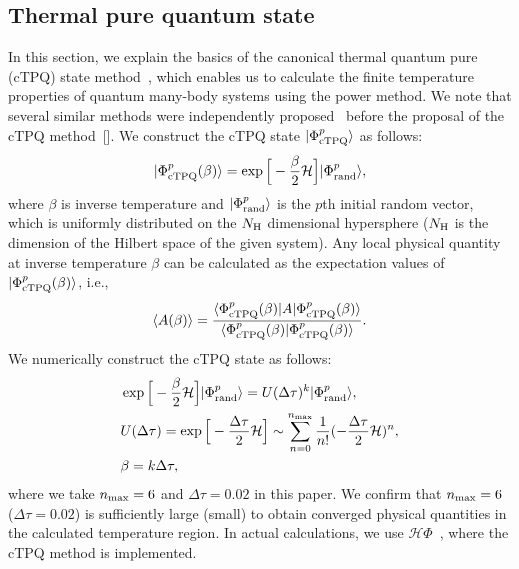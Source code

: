 \documentclass[twocolumn,superscriptaddress,showpacs, longbibliography, aps, prb]{revtex4-2}
\begin{document}
\subsection{Thermal pure quantum state}
In this section, we explain the basics of the canonical 
thermal quantum pure (cTPQ) state method~\cite{Sugiura_PRL2013}, 
which enables us to calculate the finite temperature properties of quantum many-body systems using the power method. We note that several similar methods were independently proposed~\cite{Imada_JPSJ1986,Jaklic_PRB1994,Hams_PRE2000,Lloyd} before the proposal of the cTPQ method~[].
We construct the 
cTPQ state $|\Phi_{\rm cTPQ}^{p}\rangle$ as follows:
\begin{align}
|\Phi_{\rm cTPQ}^{p}(\beta)\rangle = \exp\Big[-\frac{\beta}{2}\mathcal{H}\Big]|\Phi_{\rm rand}^{p}\rangle,
\end{align}
where $\beta$ is inverse temperature and 
$|\Phi_{\rm rand}^{p}\rangle$ is the $p$th initial random vector, which is uniformly distributed
on the $N_{\rm H}$ dimensional hypersphere ($N_{\rm H}$ is the dimension of the Hilbert space of the given system).
Any local physical quantity at inverse temperature $\beta$
can be calculated as the expectation values of $|\Phi_{\rm cTPQ}^{p}(\beta)\rangle$, i.e.,
\begin{align}
\langle A(\beta)\rangle
=\frac{\langle \Phi_{\rm cTPQ}^{p}(\beta)|A|\Phi_{\rm cTPQ}^{p}(\beta)\rangle}
{\langle \Phi_{\rm cTPQ}^{p}(\beta)|\Phi_{\rm cTPQ}^{p}(\beta)\rangle}.
\end{align}
We numerically construct the cTPQ state as follows:
\begin{align}
&\exp\Big[-\frac{\beta}{2}\mathcal{H}\Big]|\Phi_{\rm rand}^{p}\rangle=U(\Delta\tau)^{k}|\Phi_{\rm rand}^{p}\rangle,\\
&U(\Delta\tau)=\exp\Big[-\frac{\Delta\tau}{2}\mathcal{H}\Big]\sim\sum_{n=0}^{n_{\rm max}}\frac{1}{n!}(-\frac{\Delta\tau}{2}\mathcal{H})^{n},\\
&\beta=k\Delta\tau,
\end{align}
where we take $n_{\rm max}=6$ and $\Delta\tau =0.02$ in this paper.
We confirm that $n_{\rm max}=6$ ($\Delta\tau=0.02$) is sufficiently
large (small) %
to obtain converged physical quantities
in the calculated temperature region.
In actual calculations, we use $\mathcal{H}\Phi$~\cite{Kawamura_CPC2017,HPhi_v2,HPhi_release}, 
where the cTPQ method is implemented.
\end{document}
